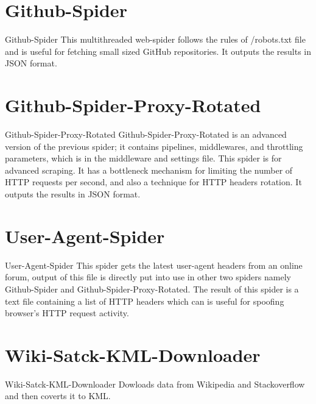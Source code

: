 \documentclass[handout,t]{beamer}
\begin{document}
\section{Github-Spider}
\begin{frame}{Github-Spider}
This multithreaded web-spider follows the rules of /robots.txt file and is useful for fetching small sized GitHub repositories. It outputs the results in JSON format.\end{frame}

\section{Github-Spider-Proxy-Rotated}
\begin{frame}{Github-Spider-Proxy-Rotated}
Github-Spider-Proxy-Rotated is an advanced version of the previous spider; it contains pipelines, middlewares, and throttling parameters, which is in the middleware and settings file. This spider is for advanced scraping. It has a bottleneck mechanism for limiting the number of HTTP requests per second, and also a technique for HTTP headers rotation. It outputs the results in JSON format.\end{frame}

\section{User-Agent-Spider}
\begin{frame}{User-Agent-Spider}
This spider gets the latest user-agent headers from an online forum, output of this file is directly put into use in other two spiders namely Github-Spider and Github-Spider-Proxy-Rotated. The result of this spider is a text file containing a list of HTTP headers which can is useful for spoofing browser's HTTP request activity.\end{frame}

\section{Wiki-Satck-KML-Downloader}
\begin{frame}{Wiki-Satck-KML-Downloader}
Dowloads data from Wikipedia and Stackoverflow and then coverts it to KML.
\end{frame}


\end{document}
